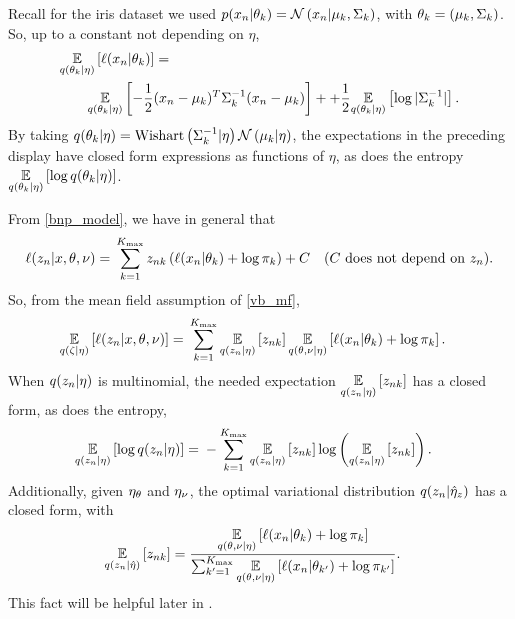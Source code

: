 \begin{ex}
%
Recall for the iris dataset we used $p(x_n \vert \theta_k) = \mathcal{N}\left(x_n \vert
\mu_k, \Sigma_k\right)$, with $\theta_k = (\mu_k, \Sigma_k)$.  So,
up to a constant not depending on $\eta$,
%
\begin{align*}
%
\MoveEqLeft
\expect{\q(\theta_\k \vert \eta)}{\logp(\x_\n \vert \theta_\k)} =\\
&
\expect{\q(\theta_\k \vert \eta)}{
-\frac{1}{2}(\x_n - \mu_k)^T \Sigma_\k^{-1} (\x_n - \mu_k)} +
+\frac{1}{2} \expect{\q(\theta_\k \vert \eta)}{\log |\Sigma_\k^{-1}|}.
%
\end{align*}
%
By taking $q(\theta_k \vert \eta) = \mathrm{Wishart}\left(\Sigma_k^{-1} \vert \eta\right)
\mathcal{N}\left(\mu_k \vert \eta\right)$, the expectations in the preceding display have closed
form expressions as functions of $\eta$, as does the entropy
$\underset{q(\theta_k \vert \eta)}{\mathbb{E}}\left[\log q(\theta_k \vert \eta)\right]$.
%
\end{ex}




\begin{ex}
%
From \eqref{bnp_model}, we have in general that
%
\begin{align*}
%
\logp(\z_n \vert \x, \theta, \nu) ={}&
\sum_{k=1}^{\kmax}
    \z_{\n\k} \left(
        \logp(\x_n \vert \theta_\k) + \log \pi_\k
    \right) + \const & \constdesc{\z_\n}.
%
\end{align*}
%
So, from the mean field assumption of \eqref{vb_mf},
%
\begin{align*}
%
\expect{\q(\zeta \vert \eta)}{\logp(\z_n \vert \x, \theta, \nu)} ={}&
\sum_{k=1}^{\kmax}
    \expect{\q(\z_\n \vert \eta)}{\z_{\n\k}}
    \expect{\q(\theta, \nu \vert \eta)}
           {\logp(\x_n \vert \theta_\k) + \log \pi_\k}.
%
\end{align*}
%
When $q(z_n \vert \eta)$ is multinomial, the needed expectation
$\underset{q(z_n \vert \eta)}{\mathbb{E}}\left[z_{nk}\right]$ has a closed form, as does the
entropy,
%
\begin{align*}
%
\expect{\q(\z_\n \vert \eta)}{\log \q(\z_\n \vert \eta)} ={}&
    - \sum_{\k=1}^{\kmax}
        \expect{\q(\z_\n \vert \eta)}{\z_{\n\k}}
        \log \left( \expect{\q(\z_\n \vert \eta)}{\z_{\n\k}} \right).
%
\end{align*}
%
Additionally, given $\eta_{\theta}$ and $\eta_{\nu}$, the optimal
variational distribution $q(z_n \vert \hat\eta_{z})$ has a closed form, with
%
\begin{align*}
%
\expect{\q(\z_\n \vert \etaopt)}{\z_{\n\k}} ={}&
\frac{
    \expect{\q(\theta, \nu \vert \eta)}
           {\logp(\x_n \vert \theta_\k) + \log \pi_\k}
}{
    \sum_{\k'=1}^{\kmax}
    \expect{\q(\theta, \nu \vert \eta)}
           {\logp(\x_n \vert \theta_{\k'}) + \log \pi_{\k'}}
}.
%
\end{align*}
%
This fact will be helpful later in .
%
\end{ex}


